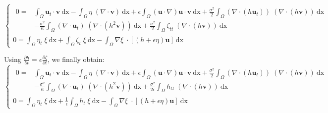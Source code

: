 \documentclass[11pt,a4paper]{article}
\begin{document}
\begin{equation}
	\left\lbrace
		\begin{array}{l}
			\begin{split}
0 = &\int_{\Omega} \! \mathbf{u}_t \cdot \mathbf{v} \: \mathrm{dx} - \int_{\Omega} \! \eta \; (\nabla \cdot \mathbf{v}) \: \mathrm{dx} + \epsilon \! \int_{\Omega} \! (\mathbf{u} \cdot \nabla ) \mathbf{u} \cdot \mathbf{v} \: \mathrm{dx} + \frac{\sigma^2}{2} \! \int_{\Omega} \!  (\nabla \cdot (h \mathbf{u}_t)) \; (\nabla \cdot (h \mathbf{v}) )\: \mathrm{dx} \\
&- \frac{\sigma^2}{6} \! \int_{\Omega} \! (\nabla \cdot \mathbf{u}_t) \; (\nabla  \cdot (h^2  \mathbf{v})) \: \mathrm{dx} + \frac{\sigma^2}{2} \! \int_{\Omega} \!  \zeta_{tt}  \; (\nabla \cdot( h \mathbf{v})) \: \mathrm{dx}
			\end{split} \\
\displaystyle 0 = \int_{\Omega}\! \eta_t \; \xi \: \mathrm{dx} +\int_{\Omega}\! \zeta_t \; \xi \: \mathrm{dx}
-\int_{\Omega}\! \nabla \xi \; \cdot [(h+\epsilon\eta) \mathbf{u}]  \: \mathrm{dx}
		\end{array}
	\right.
\end{equation}

Using $\displaystyle \frac{\partial h}{\partial t} = \epsilon \frac{\partial \zeta}{\partial t}$, we finally obtain: 
\begin{equation}
	\left\lbrace
		\begin{array}{l}
			\begin{split}
0 = &\int_{\Omega} \! \mathbf{u}_t \cdot \mathbf{v} \: \mathrm{dx} - \int_{\Omega} \! \eta \; (\nabla \cdot \mathbf{v}) \: \mathrm{dx} + \epsilon \! \int_{\Omega} \! (\mathbf{u} \cdot \nabla ) \mathbf{u} \cdot \mathbf{v} \: \mathrm{dx} + \frac{\sigma^2}{2} \! \int_{\Omega} \!  (\nabla \cdot (h \mathbf{u}_t)) \; (\nabla \cdot (h \mathbf{v}) )\: \mathrm{dx} \\
&- \frac{\sigma^2}{6} \! \int_{\Omega} \! (\nabla \cdot \mathbf{u}_t) \; (\nabla  \cdot (h^2  \mathbf{v})) \: \mathrm{dx} + \frac{\sigma^2}{2 \epsilon} \! \int_{\Omega} \!  h_{tt}  \; (\nabla \cdot( h \mathbf{v})) \: \mathrm{dx} 
			\end{split}\\
\displaystyle 0 = \int_{\Omega}\! \eta_t \; \xi \: \mathrm{dx} +\frac{1}{\epsilon}\int_{\Omega}\! h_t \; \xi \: \mathrm{dx}
-\int_{\Omega}\! \nabla \xi \; \cdot [(h+\epsilon\eta) \mathbf{u}]  \: \mathrm{dx}
		\end{array}
	\right.
\end{equation}
\end{document}
